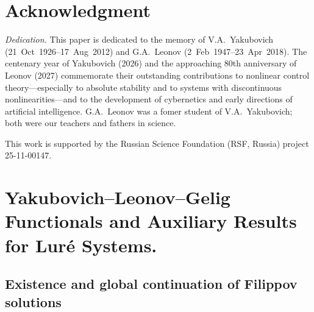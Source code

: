 \documentclass[journal]{IEEEtran}
\theoremstyle{myplain}
\begin{document}
\section*{Acknowledgment}

\noindent\textit{Dedication.} 
This paper is dedicated to the memory of V.A.~Yakubovich (21~Oct~1926--17~Aug~2012) 
and G.A.~Leonov (2~Feb~1947--23~Apr~2018). 
The centenary year of Yakubovich (2026) and the approaching 80th anniversary of Leonov (2027) 
commemorate their outstanding contributions to nonlinear control theory---especially to absolute stability and to systems with discontinuous nonlinearities---and to the development of cybernetics and early directions of artificial intelligence. 
G.A.~Leonov was a fomer student of V.A.~Yakubovich; both were our teachers and fathers in science.

\medskip
This work is supported by the Russian Science Foundation (RSF, Russia) 
project 25-11-00147.


\printbibliography 

\newpage
\appendices

\section{Yakubovich--Leonov--Gelig Functionals and Auxiliary Results for Lur\'e Systems.} \label{app:YLG}

\subsection{Existence and global continuation of Filippov solutions}
\end{document}
